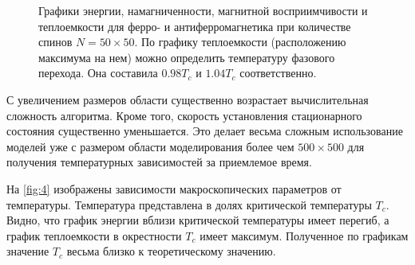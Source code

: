 \documentclass[12pt,a4paper]{article}
\begin{document}
        \begin{figure}[!htb]%
            \centering
            \hspace{8pt}%
            \hspace{8pt}%
            \caption[]{Графики энергии, намагниченности, магнитной восприимчивости и теплоемкости для ферро- и антиферромагнетика при количестве спинов $N=50\times 50$. По графику теплоемкости (расположению максимума на нем) можно определить температуру фазового перехода. Она составила $0.98 T_c$ и $1.04 T_c$ соответственно.}%
            \label{fig:4}%
        \end{figure}

        С увеличением размеров области существенно возрастает вычислительная сложность алгоритма. Кроме того, скорость установления стационарного состояния существенно уменьшается. Это делает весьма сложным использование моделей уже с размером области моделирования более чем $500 \times 500$ для получения температурных зависимостей за приемлемое время.

        На \autoref{fig:4} изображены зависимости макроскопических параметров от температуры. Температура представлена в долях критической температуры $T_c$. Видно, что график энергии вблизи критической температуры имеет перегиб, а график теплоемкости в окрестности $T_c$ имеет максимум. Полученное по графикам значение $T_c$ весьма близко к теоретическому значению.
\end{document}
